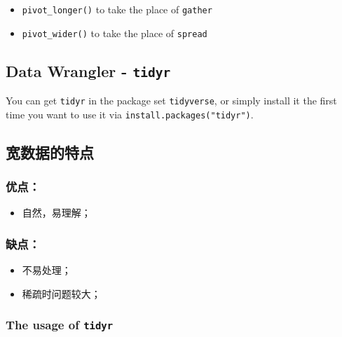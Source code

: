 \documentclass[
]{article}
\begin{document}
\begin{itemize}
\item
  \texttt{pivot\_longer()} to take the place of \texttt{gather}
\item
  \texttt{pivot\_wider()} to take the place of \texttt{spread}
\end{itemize}

\hypertarget{data-wrangler---tidyr}{%
\subsection{\texorpdfstring{Data Wrangler -
\texttt{tidyr}}{Data Wrangler - tidyr}}\label{data-wrangler---tidyr}}

You can get \texttt{tidyr} in the package set \texttt{tidyverse}, or
simply install it the first time you want to use it via
\texttt{install.packages("tidyr")}.

\hypertarget{ux5bbdux6570ux636eux7684ux7279ux70b9}{%
\subsection{宽数据的特点}\label{ux5bbdux6570ux636eux7684ux7279ux70b9}}

\hypertarget{ux4f18ux70b9}{%
\subsubsection{优点：}\label{ux4f18ux70b9}}

\begin{itemize}
\item
  自然，易理解；
\end{itemize}

\hypertarget{ux7f3aux70b9}{%
\subsubsection{缺点：}\label{ux7f3aux70b9}}

\begin{itemize}
\item
  不易处理；
\item
  稀疏时问题较大；
\end{itemize}

\hypertarget{the-usage-of-tidyr}{%
\subsubsection{\texorpdfstring{The usage of
\texttt{tidyr}}{The usage of tidyr}}\label{the-usage-of-tidyr}}
\end{document}
